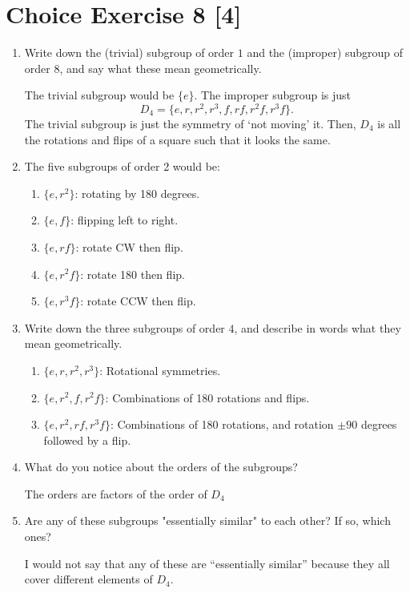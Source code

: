 \documentclass{article}
\begin{document}
\section*{Choice Exercise 8 [4]}
\begin{enumerate}
    \item {
        Write down the (trivial) subgroup of order \(1\) and the (improper) subgroup of order \(8\), and say what these mean geometrically.
    
        The trivial subgroup would be \(\{e\}\). The improper subgroup is just 
        \[       D_4 = \{e, r, r^2, r^3, f, rf, r^2f, r^3f\}.    \]
        The trivial subgroup is just the symmetry of `not moving' it. Then, 
        \(D_4\) is all the rotations and flips of a square such that it looks 
        the same.
    }
    \item {
        The five subgroups of order 2 would be:
        \begin{enumerate}
            \item \(\{e, r^2\}\): rotating by 180 degrees.
            \item \(\{e, f\}\): flipping left to right.
            \item \(\{e, rf\}\): rotate CW then flip.
            \item \(\{e, r^2f\}\): rotate 180 then flip.
            \item \(\{e, r^3f \}\): rotate CCW then flip.
        \end{enumerate}
    }
    \item {
        Write down the three subgroups of order \(4\), and describe in words what they mean geometrically.
        \begin{enumerate}
            \item \(\{e, r, r^2, r^3 \}\): Rotational symmetries.
            \item \(\{e, r^2, f, r^2f \}\): Combinations of 180 rotations and flips.
            \item \(\{e, r^2, rf, r^3f \}\): Combinations of 180 rotations, and rotation \(\pm 90\) degrees followed by a flip.
        \end{enumerate}
    }
    \item {
        What do you notice about the orders of the subgroups?

        The orders are factors of the order of \(D_4\)
    }
    \item {
        Are any of these subgroups "essentially similar" to each other? If so, which ones?
        
        I would not say that any of these are ``essentially similar'' because they 
        all cover different elements of \(D_4\).
    }
\end{enumerate}
\end{document}
